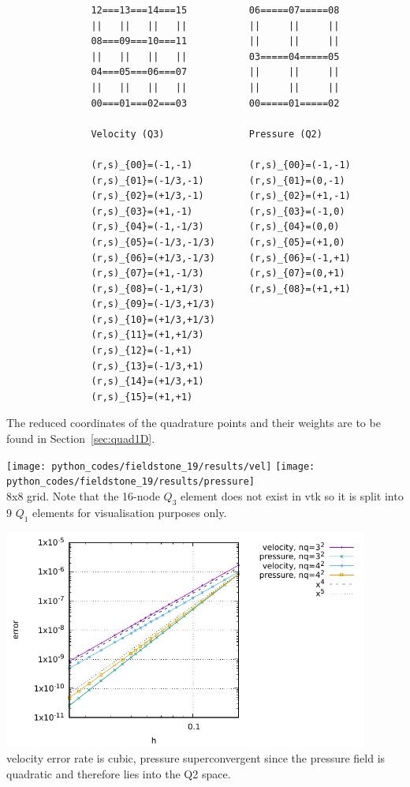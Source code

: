 \begin{verbatim}
               12===13===14===15           06=====07=====08
               ||   ||   ||   ||           ||     ||     ||
               08===09===10===11           ||     ||     ||
               ||   ||   ||   ||           03=====04=====05
               04===05===06===07           ||     ||     ||
               ||   ||   ||   ||           ||     ||     ||
               00===01===02===03           00=====01=====02

               Velocity (Q3)               Pressure (Q2)

               (r,s)_{00}=(-1,-1)          (r,s)_{00}=(-1,-1) 
               (r,s)_{01}=(-1/3,-1)        (r,s)_{01}=(0,-1) 
               (r,s)_{02}=(+1/3,-1)        (r,s)_{02}=(+1,-1) 
               (r,s)_{03}=(+1,-1)          (r,s)_{03}=(-1,0) 
               (r,s)_{04}=(-1,-1/3)        (r,s)_{04}=(0,0) 
               (r,s)_{05}=(-1/3,-1/3)      (r,s)_{05}=(+1,0) 
               (r,s)_{06}=(+1/3,-1/3)      (r,s)_{06}=(-1,+1) 
               (r,s)_{07}=(+1,-1/3)        (r,s)_{07}=(0,+1) 
               (r,s)_{08}=(-1,+1/3)        (r,s)_{08}=(+1,+1) 
               (r,s)_{09}=(-1/3,+1/3)
               (r,s)_{10}=(+1/3,+1/3)
               (r,s)_{11}=(+1,+1/3)
               (r,s)_{12}=(-1,+1)
               (r,s)_{13}=(-1/3,+1)
               (r,s)_{14}=(+1/3,+1)
               (r,s)_{15}=(+1,+1)
\end{verbatim}

The reduced coordinates of the quadrature points and their weights are to be found in 
Section~\ref{sec:quad1D}.

\begin{center}
\texttt{[image: python\_codes/fieldstone\_19/results/vel]}
\texttt{[image: python\_codes/fieldstone\_19/results/pressure]}\\
{\captionfont 8x8 grid. Note that the 16-node $Q_3$ element does not exist in vtk so it is split into 
9 $Q_1$ elements for visualisation purposes only.}
\end{center}

\begin{center}
\includegraphics[width=12cm]{python_codes/fieldstone_19/results/errors}\\
{\captionfont velocity error rate is cubic, pressure superconvergent since the pressure field
is quadratic and therefore lies into the Q2 space.}
\end{center}

